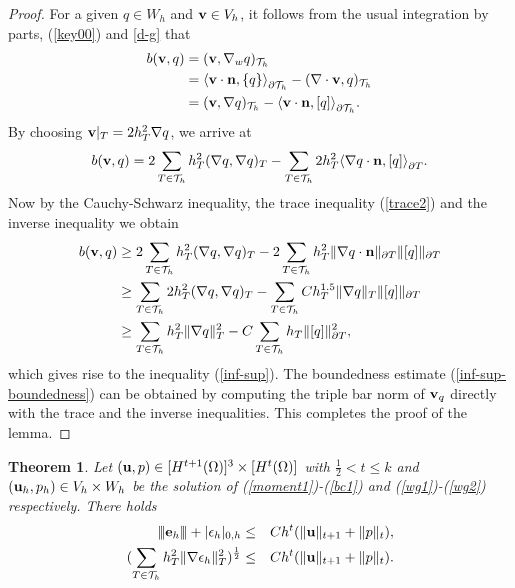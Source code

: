 \documentclass[11pt]{amsart}
\newtheorem{theorem}{Theorem}[section]
\newcommand{\bu}{{\bf u}}
\newcommand{\be}{{\bf e}}
\newcommand{\bv}{{\bf v}}
\def\T{{\mathcal T}}
\def\pT{{\partial T}}
\def\l{{\langle}}
\def\r{{\rangle}}
\def\bn{{\bf n}}
\def\3bar{{|\hspace{-.02in}|\hspace{-.02in}|}}
\begin{document}
\begin{proof}
For a given $q\in W_h$ and $\bv\in V_{h}$, it follows from the usual integration by parts, (\ref{key00}) and \eqref{d-g} that
\begin{equation*}
\begin{split}
b(\bv,q) &= (\bv, \nabla_w q)_{\T_h} \\
&= \l\bv\cdot\bn, \{q\} \r_{\partial\T_h}-
(\nabla\cdot\bv, q)_{\T_h}\\
&=  (\bv, \nabla q)_{\T_h} -\l\bv\cdot\bn,
[q]\r_{\partial\T_h}.\end{split}
\end{equation*}
By choosing $\bv|_T=2h_T^2\nabla q$, we arrive at
\begin{equation*}
b(\bv,q) = 2\sum_{T\in\T_h} h_T^2(\nabla q, \nabla q)_{T}
-\sum_{T\in\T_h} 2h_T^2\l\nabla q\cdot\bn, [q]\r_{\pT}.
\end{equation*}
Now by the Cauchy-Schwarz inequality, the trace inequality
(\ref{trace2}) and the inverse inequality we obtain
\begin{equation*}
\begin{split}
b(\bv,q) & \ge  2\sum_{T\in\T_h} h_T^2(\nabla q, \nabla q)_{T}
-2\sum_{T\in\T_h} h_T^2\|\nabla q\cdot\bn\|_{\pT} \|[q]\|_{\pT}\\
&\ge \sum_{T\in\T_h}2h_T^2(\nabla q, \nabla q)_T - \sum_{T\in\T_h}Ch_T^{1.5}\|\nabla q\|_{T} \|[q]\|_{\pT}\\
&\ge \sum_{T\in\T_h}h_T^2\|\nabla q\|_T^2 - C\sum_{T\in\T_h}h_T \|[q]\|_{\pT}^2,
\end{split}
\end{equation*}
which gives rise to the inequality (\ref{inf-sup}). The boundedness
estimate (\ref{inf-sup-boundedness}) can be obtained by computing the
triple bar norm of $\bv_q$ directly with the trace and the inverse inequalities. This completes the proof of the
lemma.
\end{proof}

\begin{theorem}\label{h1-bd}
Let $(\bu, p)\in [H^{t+1}(\Omega)]^3\times [H^{t}(\Omega)]$ with $\frac12< t\le k$ and $(\bu_h,p_h)\in
V_h\times W_h$ be the solution of (\ref{moment1})-(\ref{bc1}) and
(\ref{wg1})-(\ref{wg2}) respectively. There holds
\begin{eqnarray}
\3bar\be_h\3bar+|\epsilon_h|_{0,h}&\le&
Ch^t(\|\bu\|_{t+1}+\|p\|_t),\label{err1}\\
(\sum_{T\in\T_h} h_T^2 \|\nabla\epsilon_h\|_T^2)^\frac12 &\leq&Ch^t(\|\bu\|_{t+1}+\|p\|_t).
\label{err1-secondpart}
\end{eqnarray}
\end{theorem}
\end{document}
